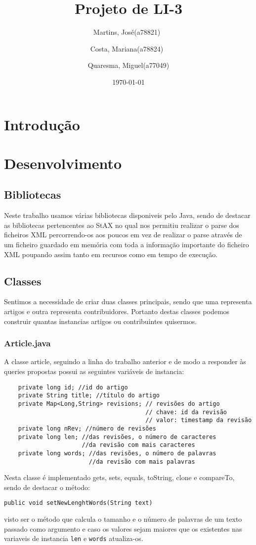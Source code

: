 \documentclass[a4paper,12pt,portuguese]{report}
\title{Projeto de LI-3}
\author{Martins, José(a78821)\
        \and
        Costa, Mariana(a78824)\
        \and
        Quaresma, Miguel(a77049)
        }
\date{\today}
\begin{document}
\begin{titlepage}
\maketitle
\end{titlepage}

\tableofcontents

\chapter{Introdução}

\chapter{Desenvolvimento}

\section{Bibliotecas}
Neste trabalho usamos várias bibliotecas disponiveis pelo Java, sendo de destacar as bibliotecas pertencentes ao StAX no qual nos permitiu realizar o parse dos ficheiros XML percorrendo-os aos poucos em vez de realizar o parse através de um ficheiro guardado em memória com toda a informação importante do ficheiro XML poupando assim tanto em recursos como em tempo de execução. 

\section{Classes}
Sentimos a necessidade de criar duas classes principais, sendo que uma representa artigos e outra representa contribuidores. Portanto destas classes podemos construir quantas instancias artigos ou contribuintes quisermos. 

\subsection{Article.java}
A classe article, seguindo a linha do trabalho anterior e de modo a responder às queries propostas possui as seguintes variáveis de instancia:
\begin{verbatim}
    private long id; //id do artigo
    private String title; //título do artigo
    private Map<Long,String> revisions; // revisões do artigo
                                        // chave: id da revisão
                                        // valor: timestamp da revisão
    private long nRev; //número de revisões
    private long len; //das revisões, o número de caracteres 
                      //da revisão com mais caracteres 
    private long words; //das revisões, o número de palavras 
                        //da revisão com mais palavras
\end{verbatim}
Nesta classe é implementado gets, sets, equals, toString, clone e compareTo, sendo de destacar o método:
\begin{verbatim}
public void setNewLenghtWords(String text)
\end{verbatim}
visto ser o método que calcula o tamanho e o número de palavras de um texto passado como argumento e caso os valores sejam maiores que os existentes nas variaveis de instancia \texttt{len} e \texttt{words} atualiza-os.
\end{document}
